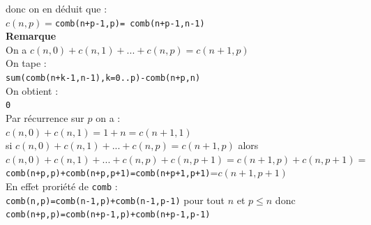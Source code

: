 \documentclass[a4paper,11pt]{book}
\begin{document}
 donc on en d\'eduit que :\\
$c(n,p)=${\tt comb(n+p-1,p)= comb(n+p-1,n-1)}\\
{\bf Remarque}\\
On a $c(n,0)+c(n,1)+...+c(n,p)=c(n+1,p)$\\ 
On tape :\\
{\tt sum(comb(n+k-1,n-1),k=0..p)-comb(n+p,n)}\\
On obtient :\\
{\tt 0}\\
Par r\'ecurrence sur $p$ on a :\\
$c(n,0)+c(n,1)=1+n=c(n+1,1)$\\
si $c(n,0)+c(n,1)+...+c(n,p)=c(n+1,p)$ alors\\
$c(n,0)+c(n,1)+...+c(n,p)+c(n,p+1)=c(n+1,p)+c(n,p+1)=$\\
{\tt comb(n+p,p)+comb(n+p,p+1)=comb(n+p+1,p+1)}=$c(n+1,p+1)$\\
 En effet prori\'et\'e de {\tt comb} :\\
{\tt comb(n,p)=comb(n-1,p)+comb(n-1,p-1)} pour tout $n$ et $p\leq n$ donc\\
{\tt comb(n+p,p)=comb(n+p-1,p)+comb(n+p-1,p-1)}
\end{document}
